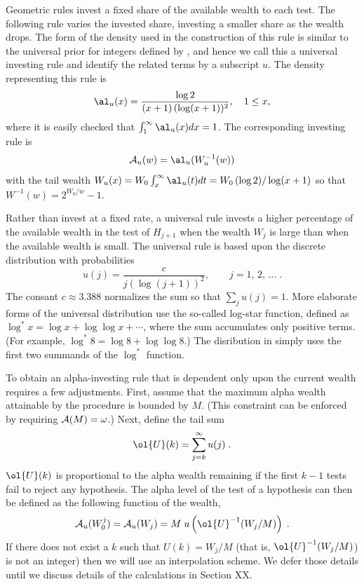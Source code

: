 \documentclass[12pt]{article}
\begin{document}
 Geometric rules invest a fixed share of the available wealth to each test.  The
 following rule varies the invested share, investing a smaller share as the
 wealth drops.  The form of the density used in the construction of this rule is
 similar to the universal prior for integers defined by \citet{rissanen83}, and
 hence we call this a universal investing rule and identify the related terms by
 a subscript $u$.  The density representing this rule is
 \begin{equation}
   \al_u(x) = \frac{\log 2}{(x+1) \, (\log (x+1))^2}, \quad 1 \le x,
 \label{eq:alu}
 \end{equation}
 where it is easily checked that $\int_1^\infty \al_u(x) dx = 1$.  The
 corresponding investing rule is
 \begin{equation}
   {\cal A}_u(w) = \al_u(W_u^{-1}(w))  
 \label{eq:Auniv}
 \end{equation} 
 with the tail wealth $W_u(x) = W_0 \int_x^\infty \al_u(t) dt = W_0\, (\log
 2)/\log(x+1)$ so that $W^{-1}(w) = 2^{W_0/w}-1$.



Rather than invest at a
 fixed rate, a universal rule invests a higher percentage of the available
 wealth in the test of $H_{j+1}$ when the wealth $W_j$ is large than when the
 available wealth is small.  The universal rule is based upon the discrete
 distribution with probabilities
 \begin{equation}
   u(j) = \frac{c}{ j (\log (j+1))^2}, \qquad 
                 j =  1,\,2,\,\ldots \;.
 \label{eq:univ}
 \end{equation}
 The consant $c \approx 3.388$ normalizes the sum so that $\sum_j u(j) = 1$.
  More elaborate forms of the universal distribution use the so-called log-star
 function, defined as $\log^* x = \log x + \log \log x + \cdots$, where the sum
 accumulates only positive terms.  (For example, $\log^{*} 8 = \log 8 + \log
 \log 8$.)  The disribution in  simply uses the first two summands
 of the $\log^{*}$ function.
 
 
 To obtain an alpha-investing rule that is dependent only upon the current
 wealth requires a few adjustments.  First, assume that the maximum alpha wealth
 attainable by the procedure is bounded by $M$.  (This constraint can be
 enforced by requiring ${\cal A}(M) = \omega$.)  Next, define the tail sum
 \begin{equation}
   \ol{U}(k) = \sum_{j=k}^{\infty} u(j) \;.
 \label{eq:Ubar}
 \end{equation}
 $\ol{U}(k)$ is proportional to the alpha wealth remaining if the first $k-1$
 tests fail to reject any hypothesis.  The alpha level of the test of a
 hypothesis can then be defined as the following function of the wealth,
 \begin{equation}
   {\cal A}_u(W_0^j) = {\cal A}_u(W_j) 
                     = M \; u \left(\ol{U}^{-1}(W_j/M) \right) \;.
 \label{eq:Auniv}
 \end{equation}
 If there does not exist a $k$ such that $U(k)=W_j/M$ (that is,
 $\ol{U}^{-1}(W_j/M)$) is not an integer) then we will use an interpolation
 scheme.  We defer those details until we discuss details of the calculations in
 Section XX.
\end{document}

